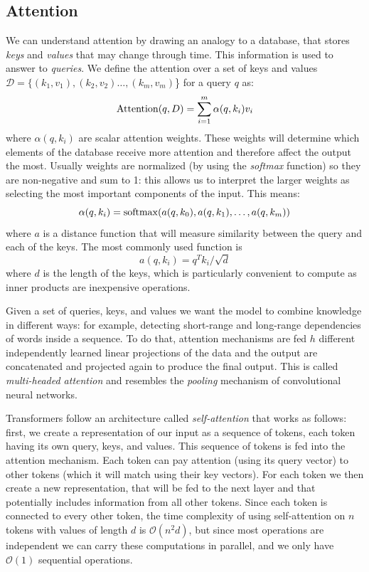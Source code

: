 \subsection{Attention}
We can understand attention by drawing an analogy to a database, that stores \textit{keys} and \textit{values} that may change through time. This information is used to answer to \textit{queries}. We define the attention over a set of keys and values \( \mathcal{D} = \{ (k_1, v_1), (k_2, v_2) \dots, (k_m, v_m) \)\} for a query \( q \) as:
\[
\operatorname{Attention}(q, D) = \sum_{i = 1}^m \alpha(q, k_i) v_i
\]
where \( \alpha(q, k_i) \) are scalar attention weights. These weights will determine which elements of the database receive more attention and therefore affect the output the most. Usually weights are normalized (by using the \textit{softmax} function) so they are non-negative and sum to 1: this allows us to interpret the larger weights as selecting the most important components of the input. This means:
\[ \alpha(q, k_i) = \operatorname{softmax}(a(q, k_0), a(q, k_1), \dots, a(q, k_m)) \] where \( a \) is a distance function that will measure similarity between the query and each of the keys. The most commonly used function is \[ a(q, k_i) = q^T k_i / \sqrt{d} \] where \( d \) is the length of the keys, which is particularly convenient to compute as inner products are inexpensive operations. 

Given a set of queries, keys, and values we want the model to combine knowledge in different ways: for example, detecting short-range and long-range dependencies of words inside a sequence. To do that, attention mechanisms are fed \( h \) different independently learned linear projections of the data and the output are concatenated and projected again to produce the final output. This is called \textit{multi-headed attention} and resembles the \textit{pooling} mechanism of convolutional neural networks.

Transformers follow an architecture called \textit{self-attention} that works as follows: first, we create a representation of our input as a sequence of tokens, each token having its own query, keys, and values. This sequence of tokens is fed into the attention mechanism. Each token can pay attention (using its query vector) to other tokens (which it will match using their key vectors). For each token we then create a new representation, that will be fed to the next layer and that potentially includes information from all other tokens. Since each token is connected to every other token, the time complexity of using self-attention on \( n \) tokens with values of length \( d \) is \( \mathcal{O}(n^2 d) \), but since most operations are independent we can carry these computations in parallel, and we only have \( \mathcal{O}(1) \) sequential operations.

